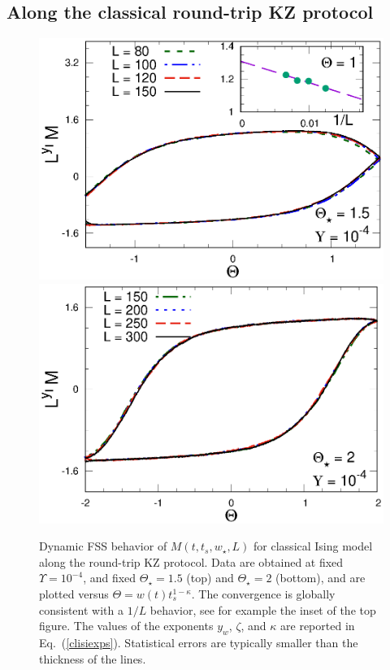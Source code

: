\subsection{Along the classical round-trip KZ protocol}
\label{clroundtrip}


\begin{figure}[!htb]
\centering
  \includegraphics[width=0.65\columnwidth]{imm/isC2DT15Y104.eps}
  \includegraphics[width=0.65\columnwidth]{imm/isC2DT2Y104.eps}
  \caption{ Dynamic FSS behavior of $M(t,t_s,w_\star,L)$ for classical
    Ising model along the round-trip KZ protocol. Data are obtained at
    fixed $\Upsilon=10^{-4}$, and fixed $\Theta_\star = 1.5$ (top) and
    $\Theta_\star = 2$ (bottom), and are plotted versus $\Theta=w(t)
    t_s^{1-\kappa}$. The convergence is globally consistent with a
    $1/L$ behavior, see for example the inset of the top figure.  The
    values of the exponents $y_w$, $\zeta$, and $\kappa$ are reported
    in Eq.~(\ref{clisiexps}). Statistical errors are typically smaller
    than the thickness of the lines.}
  \label{roundtripM}
\end{figure}


